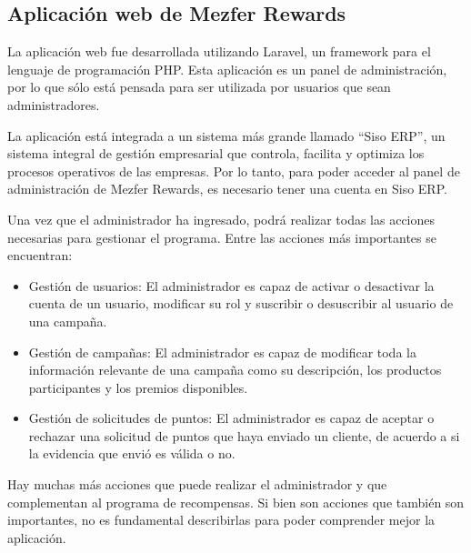 \subsection{Aplicación web de Mezfer Rewards}
La aplicación web fue desarrollada utilizando Laravel, un framework para el lenguaje de programación PHP. Esta aplicación es un panel de administración, por lo que sólo está pensada para ser utilizada por usuarios que sean administradores. 

La aplicación está integrada a un sistema más grande llamado ``Siso ERP'', un sistema integral de gestión empresarial que controla, facilita y optimiza los procesos operativos de las empresas. Por lo tanto, para poder acceder al panel de administración de Mezfer Rewards, es necesario tener una cuenta en Siso ERP.

Una vez que el administrador ha ingresado, podrá realizar todas las acciones necesarias para gestionar el programa. Entre las acciones más importantes se encuentran: 
\begin{itemize}
    \item Gestión de usuarios: El administrador es capaz de activar o desactivar la cuenta de un usuario, modificar su rol y suscribir o desuscribir al usuario de una campaña.
    \item Gestión de campañas: El administrador es capaz de modificar toda la información relevante de una campaña como su descripción, los productos participantes y los premios disponibles.
    \item Gestión de solicitudes de puntos: El administrador es capaz de aceptar o rechazar una solicitud de puntos que haya enviado un cliente, de acuerdo a si la evidencia que envió es válida o no. 
\end{itemize}
Hay muchas más acciones que puede realizar el administrador y que complementan al programa de recompensas. Si bien son acciones que también son importantes, no es fundamental describirlas para poder comprender mejor la aplicación.